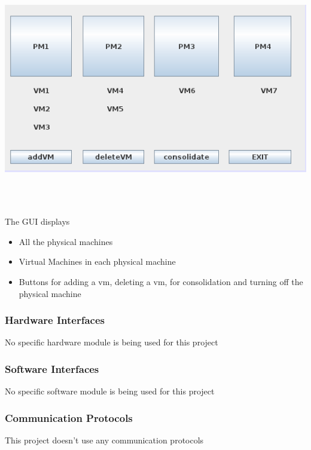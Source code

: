 \documentclass[a4paper,11pt]{article}
\begin{document}
			\includegraphics[height=10cm]{images/gui}
			\\
			\\
			The GUI displays 			
			\begin{itemize}
				\item All the physical machines
				\item Virtual Machines in each physical machine
				\item Buttons for adding a vm, deleting a vm, for consolidation and turning off 
				the physical machine
			\end{itemize}

			\subsubsection{Hardware Interfaces}
			No specific hardware module is being used for this project
			\subsubsection{Software Interfaces}
			No specific software module is being used for this project 
			\subsubsection{Communication Protocols}
			This project doesn’t use any communication protocols
\end{document}
